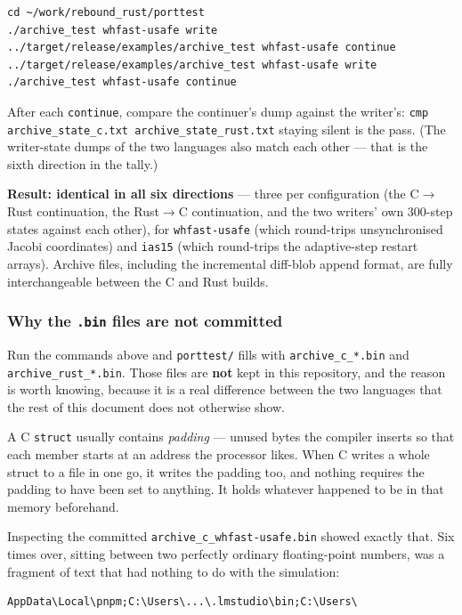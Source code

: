 \documentclass[11pt]{article}
\begin{document}
\begin{lstlisting}
cd ~/work/rebound_rust/porttest
./archive_test whfast-usafe write
../target/release/examples/archive_test whfast-usafe continue
../target/release/examples/archive_test whfast-usafe write
./archive_test whfast-usafe continue
\end{lstlisting}

After each \texttt{continue}, compare the continuer's dump against the writer's: \texttt{cmp archive\_state\_c.txt archive\_state\_rust.txt} staying silent is the pass. (The writer-state dumps of the two languages also match each other --- that is the sixth direction in the tally.)

\textbf{Result: identical in all six directions} --- three per configuration (the C\(\rightarrow\)Rust continuation, the Rust\(\rightarrow\)C continuation, and the two writers' own 300-step states against each other), for \texttt{whfast-usafe} (which round-trips unsynchronised Jacobi coordinates) and \texttt{ias15} (which round-trips the adaptive-step restart arrays). Archive files, including the incremental diff-blob append format, are fully interchangeable between the C and Rust builds.

\subsubsection{Why the \texttt{.bin} files are not committed}

Run the commands above and \texttt{porttest/} fills with \texttt{archive\_c\_*.bin} and \texttt{archive\_rust\_*.bin}. Those files are \textbf{not} kept in this repository, and the reason is worth knowing, because it is a real difference between the two languages that the rest of this document does not otherwise show.

A C \texttt{struct} usually contains \emph{padding} --- unused bytes the compiler inserts so that each member starts at an address the processor likes. When C writes a whole struct to a file in one go, it writes the padding too, and nothing requires the padding to have been set to anything. It holds whatever happened to be in that memory beforehand.

Inspecting the committed \texttt{archive\_c\_whfast-usafe.bin} showed exactly that. Six times over, sitting between two perfectly ordinary floating-point numbers, was a fragment of text that had nothing to do with the simulation:

\begin{lstlisting}
AppData\Local\pnpm;C:\Users\...\.lmstudio\bin;C:\Users\
\end{lstlisting}
\end{document}
